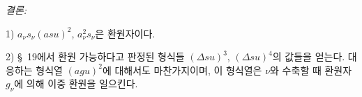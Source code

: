 
\noindent\emph{결론:}

1) $a_\nu s_\nu(asu)^2$, $a_\nu^2s_\nu$은 환원자이다.

2) \S\ 19에서 환원 가능하다고 판정된 형식들 $(\Delta su)^3$, $(\Delta su)^4$의 값들을 얻는다. 대응하는 형식열 $(agu)^2$에 대해서도 마찬가지이며, 이 형식열은 $\nu$와 수축할 때 환원자 $g_\nu$에 의해 이중 환원을 일으킨다.
